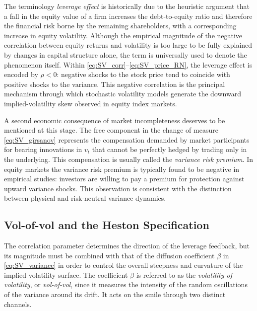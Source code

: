 \begin{remark}\label{rem:leverage}
The terminology \emph{leverage effect} is historically due to the
heuristic argument that a fall in the equity value of a firm increases
the debt-to-equity ratio and therefore the financial risk borne by the
remaining shareholders, with a corresponding increase in equity
volatility. Although the empirical magnitude of the negative correlation
between equity returns and volatility is too large to be fully explained
by changes in capital structure alone, the term is universally used to
denote the phenomenon itself. Within
\eqref{eq:SV_corr}--\eqref{eq:SV_price_RN}, the leverage effect is
encoded by $\rho<0$: negative shocks to the stock price tend to coincide
with positive shocks to the variance. This negative correlation is the
principal mechanism through which stochastic volatility models generate
the downward implied-volatility skew observed in equity index markets.
\end{remark}

A second economic consequence of market incompleteness deserves to be
mentioned at this stage. The free component in the change of measure
\eqref{eq:SV_girsanov} represents the compensation demanded by market
participants for bearing innovations in $v_t$ that cannot be perfectly
hedged by trading only in the underlying. This compensation is usually
called the \emph{variance risk premium}. In equity markets the variance
risk premium is typically found to be negative in empirical studies:
investors are willing to pay a premium for protection against upward
variance shocks. This observation is consistent with the distinction
between physical and risk-neutral variance dynamics.
\subsection{Vol-of-vol and the Heston Specification}


The correlation parameter determines the direction of the leverage
feedback, but its magnitude must be combined with that of the diffusion
coefficient $\beta$ in \eqref{eq:SV_variance} in order to control the
overall steepness and curvature of the implied volatility surface. The
coefficient $\beta$ is referred to as the \emph{volatility of
volatility}, or \emph{vol-of-vol}, since it measures the intensity of the
random oscillations of the variance around its drift. It acts on the
smile through two distinct channels.

